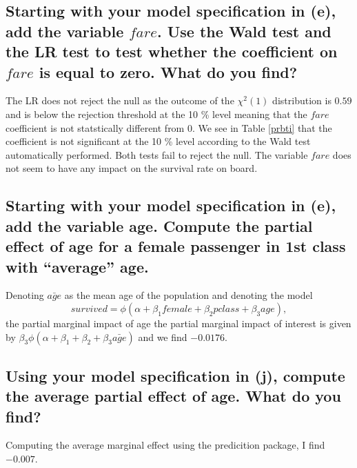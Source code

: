 \documentclass[12pt]{article}
\begin{document}
\subsection{Starting with your model specification in (e), add the variable $fare$. Use the Wald test and the LR test to test whether the coefficient on $fare$ is equal to zero. What do you find?}

The LR does not reject the null as the outcome of the $\chi^2(1)$ distribution is $0.59$ and is below the rejection threshold at the 10 \% level meaning that the $fare$ coefficient is not statstically different from 0. We see in Table \ref{prbti} that the coefficient is not significant at the 10 \% level according to the Wald test automatically performed. Both tests fail to reject the null. The variable $fare$ does not seem to have any impact on the survival rate on board.

\subsection{Starting with your model specification in (e), add the variable age. Compute the partial effect of age for a female passenger in 1st class with “average” age.}

Denoting $\bar{age}$ as the mean age of the population and denoting the model
$$survived = \phi(\alpha + \beta_1 female + \beta_2 pclass + \beta_3 age),$$ the partial marginal impact of age 
the partial marginal impact of interest is given by $\beta_3 \phi(\alpha + \beta_1 + \beta_2 + \beta_3 \bar{age})$ and we find $-0.0176$.

\subsection{Using your model specification in (j), compute the average partial effect of age. What do you find?}
Computing the average marginal effect using the predicition package, I find $-0.007$.
\end{document}
